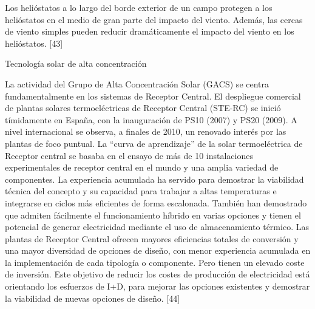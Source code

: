 \documentclass[12pt]{article}
\begin{document}
Los helióstatos a lo largo del borde exterior de un campo protegen a los helióstatos en el medio de gran parte del impacto del viento. Además, las cercas de viento simples pueden reducir dramáticamente el impacto del viento en los helióstatos. [43]



Tecnología solar de alta concentración

La actividad del Grupo de Alta Concentración Solar (GACS) se centra fundamentalmente en los sistemas de Receptor Central. El despliegue comercial de plantas solares termoeléctricas de Receptor Central (STE-RC) se inició tímidamente en España, con la inauguración de PS10 (2007) y PS20 (2009). A nivel internacional se observa, a finales de 2010, un renovado interés por las plantas de foco puntual.
La “curva de aprendizaje” de la solar termoeléctrica de Receptor central se basaba en el ensayo de más de 10 instalaciones experimentales de receptor central en el mundo y una amplia variedad de componentes.
La experiencia acumulada ha servido para demostrar la viabilidad técnica del concepto y su capacidad para trabajar a altas temperaturas e integrarse en ciclos más eficientes de forma escalonada. También han demostrado que admiten fácilmente el funcionamiento híbrido en varias opciones y tienen el potencial de generar electricidad mediante el uso de almacenamiento térmico.
Las plantas de Receptor Central ofrecen mayores eficiencias totales de conversión y una mayor diversidad de opciones de diseño, con menor experiencia acumulada en la implementación de cada tipología o componente. Pero tienen un elevado coste de inversión.
Este objetivo de reducir los costes de producción de electricidad está orientando los esfuerzos de I+D, para mejorar las opciones existentes y demostrar la viabilidad de nuevas opciones de diseño. [44]
\end{document}
